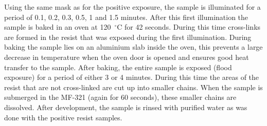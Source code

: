 Using the same mask as for the positive exposure, the sample is illuminated for a period of 0.1, 0.2, 0.3, 0.5, 1 and 1.5 minutes. After this first illumination the sample is baked in an oven at 120~$^\circ$C for 42 seconds. During this time cross-links are formed in the resist that was exposed during the first illumination. During baking the sample lies on an aluminium slab inside the oven, this prevents a large decrease in temperature when the oven door is opened and ensures good heat transfer to the sample. After baking, the entire sample is exposed (flood exposure) for a period of either 3 or 4 minutes. During this time the areas of the resist that are not cross-linked are cut up into smaller chains. When the sample is submerged in the MF-321 (again for 60 seconds), these smaller chains are dissolved. After development, the sample is rinsed with purified water as was done with the positive resist samples\cite{az5214}.


